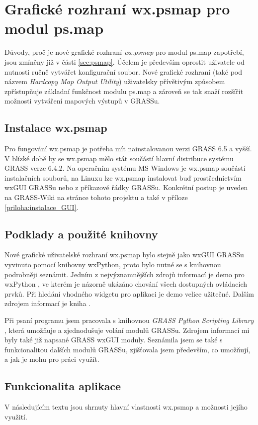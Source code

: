 \documentclass[a4paper,12pt,draft]{article}
\begin{document}
{\section[Grafické rozhraní pro modul ps.map]{Grafické rozhraní
 wx.psmap pro modul ps.map}
\label{sec:gui}

Důvody, proč je nové grafické rozhraní \emph{wx.psmap} pro
modul ps.map zapotřebí, jsou zmíněny již v části
\ref{sec:psmap}. Účelem je především oprostit uživatele od nutnosti
ručně vytvářet konfigurační soubor. Nové grafické rozhraní  (také
pod názvem \emph{Hardcopy Map Output Utility}) uživatelsky
přívětivým způsobem zpřístupňuje základní funkčnost modulu
ps.map a zároveň se tak snaží rozšířit možnosti vytváření
mapových výstupů v GRASSu.

\subsection{Instalace wx.psmap}
Pro fungování wx.psmap je potřeba mít nainstalovanou verzi
GRASS 6.5 a vyšší. V blízké době by se wx.psmap mělo stát součástí hlavní
distribuce systému GRASS verze 6.4.2. Na operačním systému MS Windows je
wx.psmap součástí instalačních souborů, na Linuxu lze wx.psmap instalovat buď
prostřednictvím wxGUI GRASSu nebo z příkazové řádky GRASSu. Konkrétní
postup je uveden na GRASS-Wiki na stránce tohoto projektu \cite{wiki_wxpsmap} a
také v příloze \ref{priloha:instalace_GUI}.

\subsection{Podklady a použité knihovny}
Nové grafické uživatelské rozhraní wx.psmap bylo stejně jako wxGUI
GRASSu vyvinuto pomocí knihovny wxPython,
proto bylo nutné se s knihovnou podrobněji seznámit. Jedním z
nejvýznamnějších zdrojů informací je demo pro wxPython \cite{demo},
ve kterém je názorně ukázáno chování všech dostupných ovládacích
prvků. Při hledání vhodného widgetu pro aplikaci je demo velice užitečné.
Dalším zdrojem informací je kniha \cite{wxPythonInAction}.

Při psaní programu jsem pracovala s knihovnou \emph{GRASS Python
Scripting Library} \cite{script}, která umožňuje a zjednodušuje
volání modulů GRASSu. Zdrojem informací mi byly také
již napsané GRASS wxGUI moduly. Seznámila jsem se také s funkcionalitou
dalších  modulů GRASSu, zjišťovala
jsem především, co umožňují, a jak je mohu pro práci využít.

\subsection{Funkcionalita aplikace}
V následujícím textu jsou shrnuty hlavní vlastnosti wx.psmap a možnosti
jejího využití.

}
\end{document}

